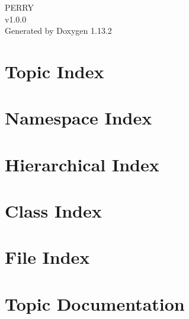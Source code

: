\documentclass[twoside]{book}
\newcommand{\+}{\discretionary{\mbox{\scriptsize$\hookleftarrow$}}{}{}}
\newcommand{\clearemptydoublepage}{%
    \newpage{\pagestyle{empty}\cleardoublepage}%
  }
\begin{document}
  \raggedbottom
    \hypersetup{pageanchor=false,
                bookmarksnumbered=true,
                pdfencoding=unicode
               }
  \begin{titlepage}
  \vspace*{7cm}
  \begin{center}%
  {\Large PERRY}\\
  [1ex]\large v1.\+0.\+0 \\
  \vspace*{1cm}
  {\large Generated by Doxygen 1.13.2}\\
  \end{center}
  \end{titlepage}
  \clearemptydoublepage
  \tableofcontents
  \clearemptydoublepage
  \hypersetup{pageanchor=true}





\chapter{Topic Index}

\chapter{Namespace Index}

\chapter{Hierarchical Index}

\chapter{Class Index}

\chapter{File Index}

\chapter{Topic Documentation}






\end{document}
